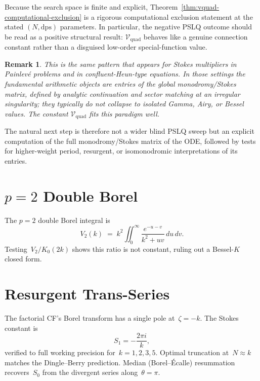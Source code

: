 \documentclass[11pt,a4paper]{article}
\newtheorem{remark}[theorem]{Remark}
\begin{document}
Because the search space is finite and explicit,
Theorem~\ref{thm:vquad-computational-exclusion} is a rigorous
computational exclusion statement at the stated $(N,\mathrm{dps})$
parameters. In particular, the negative PSLQ outcome should be read as a
positive structural result: $\mathcal{V}_{\mathrm{quad}}$ behaves like a genuine
connection constant rather than a disguised low-order special-function
value.

\begin{remark}\label{rem:vquad-stokes-pattern}
This is the same pattern that appears for Stokes multipliers in
Painlev\'e problems and in confluent-Heun-type equations. In those
settings the fundamental arithmetic objects are entries of the global
monodromy/Stokes matrix, defined by analytic continuation and sector
matching at an irregular singularity; they typically do not collapse to
isolated Gamma, Airy, or Bessel values. The constant
$\mathcal{V}_{\mathrm{quad}}$ fits this paradigm well.
\end{remark}

The natural next step is therefore not a wider blind PSLQ sweep but an
explicit computation of the full monodromy/Stokes matrix of the ODE,
followed by tests for higher-weight period, resurgent, or isomonodromic
interpretations of its entries.

\section{\texorpdfstring{$p=2$}{p=2} Double Borel}\label{sec:double_borel}

The $p=2$ double Borel integral is
\[
  V_2(k) \;=\; k^2\iint_0^\infty \frac{e^{-u-v}}{k^2 + uv}\,du\,dv.
\]
Testing~$V_2/K_0(2k)$ shows this ratio is not constant, ruling out a Bessel-$K$ closed form.

\section{Resurgent Trans-Series}\label{sec:resurgence}

The factorial CF's Borel transform has a single pole at~$\zeta = -k$. The Stokes constant is
\[
  S_1 = -\frac{2\pi i}{k},
\]
verified to full working precision for~$k = 1, 2, 3, 5$. Optimal truncation at~$N \approx k$ matches the Dingle--Berry prediction. Median (Borel--\'Ecalle) resummation recovers~$S_0$ from the divergent series along~$\theta = \pi$.
\end{document}

